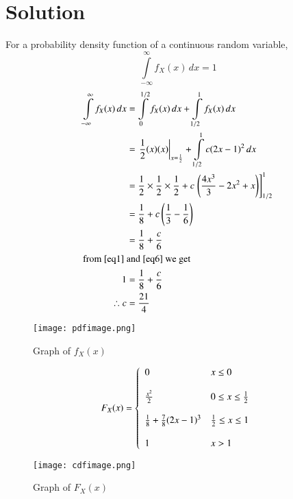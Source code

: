 \documentclass[journal,12pt,twocolumn]{IEEEtran}
\begin{document}
\section*{Solution}
For a probability density function of a continuous random variable, 
\begin{equation}
    \int \limits_{-\infty}^{\infty} f_X(x) \, dx = 1 \label{eq1}
\end{equation}
\begin{align}
    \int \limits_{-\infty}^{\infty} f_X(x) \, dx &=  \int \limits_0^{1/2} f_X(x) \, dx + \int \limits_{1/2}^1 f_X(x) \, dx\\
    &= \left. \frac{1}{2} (x)(x) \right\rvert_{x = \frac{1}{2}} + \int \limits_{1/2}^1 c(2x-1)^2 \, dx\\
    &= \frac{1}{2}\times\frac{1}{2}\times\frac{1}{2} + c{}\left.\left(\frac{4x^3}{3} - 2x^2 + x\right)\right]_{1/2}^1 \\
    &= \frac{1}{8} + c\left(\frac{1}{3} - \frac{1}{6}\right) \\
    &= \frac{1}{8} + \frac{c}{6}  \label{eq6}\\
    \intertext{from \eqref{eq1}  and \eqref{eq6} we get }
    1 &= \frac{1}{8} + \frac{c}{6} \\
    \therefore c &= \frac{21}{4}
\end{align}
\begin{figure}[!ht]
\centering
\texttt{[image: pdfimage.png]}
\caption{Graph of $f_X(x)$}
\end{figure}
\begin{displaymath}
    F_X(x)=\left\{
                    \begin{array}{ll}
                        0 & x\leq 0 \\\\
		                \frac{x^2}{2} &   0 \leq x \leq \frac{1}{2}  \\\\
		                \frac{1}{8} + \frac{7}{8} (2x-1)^3 & \frac{1}{2} \leq x \leq 1 \\\\
		                1 & x>1\\
	                \end{array}    
                \right.
\end{displaymath}
\begin{figure}[!ht]
\centering
\texttt{[image: cdfimage.png]}
\caption{Graph of $F_X(x)$}
\end{figure}
\end{document}
